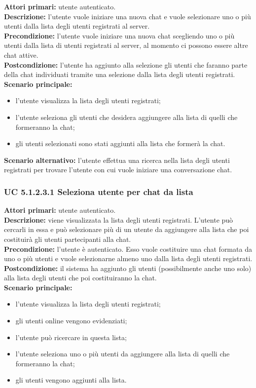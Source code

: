 \noindent
\textbf{Attori primari:} utente autenticato.\\
\textbf{Descrizione:} l'utente vuole iniziare una nuova chat e vuole selezionare uno o più utenti dalla lista degli utenti registrati al server.\\
\textbf{Precondizione:} l'utente vuole iniziare una nuova chat scegliendo uno o più utenti dalla lista di utenti registrati al server, al momento ci possono essere altre chat attive.\\ 
\textbf{Postcondizione:}  l'utente ha aggiunto alla selezione gli utenti che faranno parte della chat individuati tramite una selezione dalla lista degli utenti registrati.\\
\textbf{Scenario principale:}
\begin{itemize}
\item l'utente visualizza la lista degli utenti registrati;
\item l'utente seleziona gli utenti che desidera aggiungere alla lista di quelli che formeranno la chat;
\item gli utenti selezionati sono stati aggiunti alla lista che formerà la chat.
\end{itemize}
\textbf{Scenario alternativo:} l'utente effettua una ricerca nella lista degli utenti registrati per trovare l'utente con cui vuole iniziare una conversazione chat.

\subsubsection{UC 5.1.2.3.1 Seleziona utente per chat da lista}
\noindent
\textbf{Attori primari:} utente autenticato.\\
\textbf{Descrizione:} viene visualizzata la lista degli utenti registrati. L'utente può cercarli in essa e può selezionare più di un utente da aggiungere alla lista che poi costituirà gli utenti partecipanti alla chat.\\
\textbf{Precondizione:} l'utente è autenticato. Esso vuole costituire una chat formata da uno o più utenti e vuole selezionarne almeno uno dalla lista degli utenti registrati.\\
\textbf{Postcondizione:} il sistema ha aggiunto gli utenti (possibilmente anche uno solo) alla lista degli utenti che poi costituiranno la chat.\\
\textbf{Scenario principale:}
\begin{itemize}
\item l'utente visualizza la lista degli utenti registrati;
\item gli utenti online vengono evidenziati;
\item l'utente può ricercare in questa lista;
\item l'utente seleziona uno o più utenti da aggiungere alla lista di quelli che formeranno la chat;
\item gli utenti vengono aggiunti alla lista.
\end{itemize}

